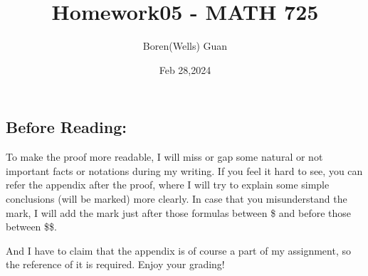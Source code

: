 \documentclass[lang=en,11pt,a4paper,citestyle =authoryear]{elegantpaper}
\title{Homework05 - MATH 725}
\author{Boren(Wells) Guan}
\date{Feb 28,2024}
\begin{document}
\maketitle

\subsection*{Before Reading:}\par
To make the proof more readable, I will miss or gap some natural or not important facts or notations during my writing. If you feel it hard to see, you can refer the appendix after the proof, where I will try to explain some simple conclusions (will be marked) more clearly. In case that you misunderstand the mark, I will add the mark just after those formulas between \$ and before those between \$\$.\par
And I have to claim that the appendix is of course a part of my assignment, so the reference of it is required. Enjoy your grading!
\end{document}
